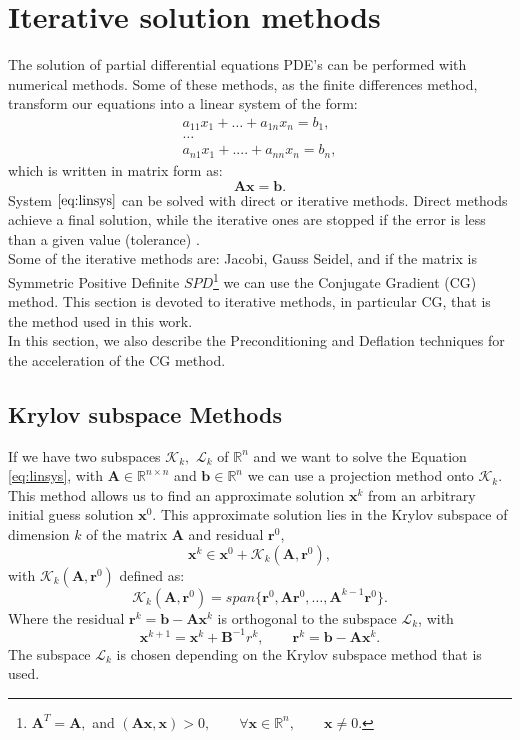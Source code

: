 \documentclass[12pt]{article}
\numberwithin{equation}{section}
\begin{document}
\section{Iterative solution methods}\label{syseq}
The solution of partial differential equations PDE's 
can be performed with numerical methods. Some of these methods, as the finite differences method, 
transform our equations into a linear 
system of the form:
\begin{gather*}
a_{11}x_{1}+\dots+a_{1n}x_{n}=b_{1},\\
\dots\\
a_{n1}x_{1}+....+a_{nn}x_{n}=b_{n},
\end{gather*}
which is written in matrix form as:
\begin{equation}\label{eq:linsys}
 \mathbf{A}\mathbf{x}=\mathbf{b}.
\end{equation}
System $\eqref{eq:linsys}$ can be solved with direct or iterative methods. Direct methods achieve a final solution, 
while the iterative ones
are stopped if the error is less than a given value (tolerance) \cite{Saad03}. \\
Some of the iterative methods are: Jacobi, Gauss Seidel, and if the
matrix is Symmetric Positive Definite $SPD$\footnote{$\mathbf{A}^T=\mathbf{A},$ and $(\mathbf{A}\mathbf{x},\mathbf{x})>0, \qquad \forall \mathbf{x} \in \mathbb{R}^n, \qquad \mathbf{x}\neq0.$} we can use the Conjugate Gradient (CG) method.
This section is devoted to iterative methods, in particular CG, that is the
method used in this work. \\
In this section, we also describe the Preconditioning and Deflation techniques 
for the acceleration of the CG method.
\subsection{Krylov subspace Methods}
If we have two subspaces $\mathcal{K}_k,$ $\mathcal{L}_k$ of $\mathbb{R}^n$ and we want to solve 
the Equation \eqref{eq:linsys}, 
with $\mathbf{A} \in \mathbb{R}^{n\times n}$ and $\mathbf{b} \in \mathbb{R}^{n}$ we can use a projection method 
onto $\mathcal{K}_k$.
This method allows us to find an approximate solution $\mathbf{x}^k$ from an arbitrary initial guess 
solution $\mathbf{x}^0$. This approximate solution lies in the Krylov subspace of dimension $k$ of the 
matrix $\mathbf{A}$ 
and residual $\mathbf{r}^0$,
\begin{equation*}
\mathbf{x}^k \in \mathbf{x}^0+\mathcal{K}_k(\mathbf{A},\mathbf{r}^0),
\end{equation*}
with $\mathcal{K}_k(\mathbf{A},\mathbf{r}^0)$ defined as:
\begin{equation*}
\mathcal{K}_k(\mathbf{A},\mathbf{r}^0)=span\{\mathbf{r}^0,\mathbf{A}\mathbf{r}^0,\dots,\mathbf{A}^{k-1}\mathbf{r}^0\}.
\end{equation*}
Where the residual $\mathbf{r}^k=\mathbf{b}-\mathbf{A}\mathbf{x}^k$ is orthogonal to the subspace $\mathcal{L}_k$, with 
\begin{equation*}
 \mathbf{x}^{k+1}=\mathbf{x}^k+\mathbf{B}^{-1}r^k, \qquad \mathbf{r}^k=\mathbf{b}-\mathbf{A}\mathbf{x}^k.
\end{equation*}
The subspace $\mathcal{L}_k$ is chosen depending on the Krylov subspace method that is used.
\end{document}
